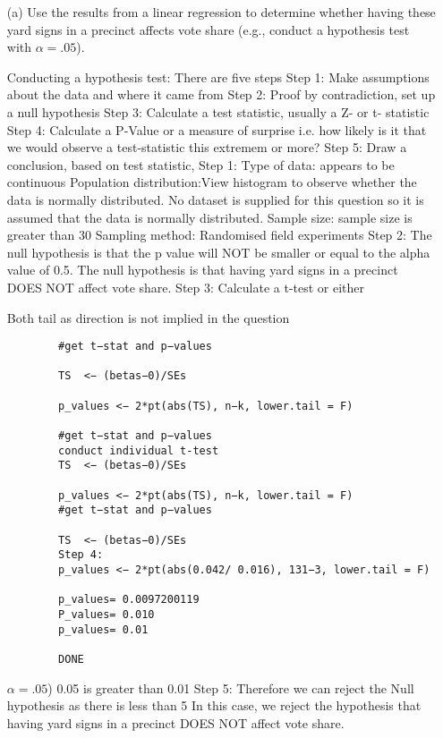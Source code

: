 \documentclass[12pt,letterpaper]{article}
\begin{document}
	\vspace{.5cm}
	\begin{enumerate}
		\item [(a)] Use the results from a linear regression to determine whether having these yard signs in a precinct affects vote share (e.g., conduct a hypothesis test with $\alpha = .05$).
		
	
		Conducting a hypothesis test: There are five steps
		Step 1: Make assumptions about the data and where it came from
		Step 2: Proof by contradiction, set up a null hypothesis
		Step 3: Calculate a test statistic, usually a Z- or t- statistic
		Step 4: Calculate a P-Value or a measure of surprise i.e. how likely 
		is it that we would observe a test-statistic this extremem or more?
		Step 5: Draw a conclusion, based on test statistic, 
		Step 1: Type of data: appears to be continuous
		Population distribution:View histogram to observe 
		whether the data is normally distributed. 
		No dataset is supplied for this question so it is 
		assumed that the data is normally distributed.
		Sample size: sample size is greater than 30 
		Sampling method: Randomised field experiments
		Step 2: The null hypothesis is that the p value will
		 NOT be smaller or equal to the alpha value of 0.5. 
		 The null hypothesis is that having yard signs in a precinct
		  DOES NOT affect vote share. 
		Step 3: Calculate a t-test  or either 
		
		Both tail as direction is not implied in the question
			\begin{verbatim}
		#get t−stat and p−values
		
		TS	<− (betas−0)/SEs
		
		p_values <− 2*pt(abs(TS), n−k, lower.tail = F)
		
		#get t−stat and p−values
		conduct individual t-test
		TS	<− (betas−0)/SEs
		
		p_values <− 2*pt(abs(TS), n−k, lower.tail = F)
		#get t−stat and p−values
		
		TS	<− (betas−0)/SEs
		Step 4:
		p_values <− 2*pt(abs(0.042/ 0.016), 131−3, lower.tail = F)
		
		p_values= 0.0097200119
		P_values= 0.010
		p_values= 0.01
		
		DONE
	\end{verbatim}
		 $\alpha = .05$)
		 0.05 is greater than 0.01 
		Step 5:   Therefore we can reject the Null hypothesis as 
		there is less than 5%
		In this case, we reject the hypothesis  that having yard 
		signs in a precinct DOES NOT affect vote share. 



\end{enumerate}
\end{document}
